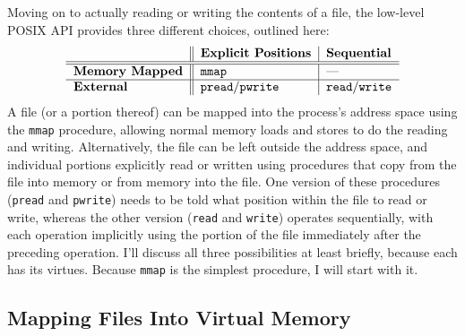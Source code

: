 Moving on to actually reading or
writing the contents of a file, the low-level POSIX API provides three
different choices, outlined here:
\[\label{file-access-styles-table}\begin{tabular}{l||l|l}
&\bf Explicit Positions&\bf Sequential\\\hline\hline
\bf Memory Mapped&\texttt{mmap}&---\\\hline
\bf External&\texttt{pread}/\texttt{pwrite}&\texttt{read}/\texttt{write}
\end{tabular}\]
A file (or a portion thereof) can be mapped into
the process's address space using the \verb|mmap| procedure, allowing
normal memory loads and stores to do the reading and writing.  Alternatively, the
file can be left outside the address space, and individual portions
explicitly read or written using procedures that copy from the file
into memory or from memory into the file.  One version of these
procedures (\verb|pread| and \verb|pwrite|) needs to be told what
position within the file to read or write, whereas the other version
(\verb|read| and \verb|write|) operates sequentially, with each
operation implicitly using the portion of the file immediately after
the preceding operation.  I'll discuss all three possibilities at
least briefly, because each has its virtues.  Because \verb|mmap| is the
simplest procedure, I will start with it.

\subsection{Mapping Files Into Virtual Memory}


